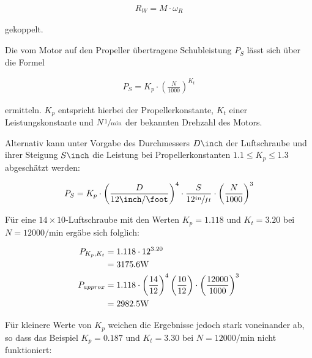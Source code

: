 \begin{align}
	R_W = M \cdot \omega_R
\end{align}

gekoppelt.

\bigbreak {}

Die vom Motor auf den Propeller übertragene Schubleistung $P_S$ lässt sich über die Formel

\begin{align}
	P_S = K_p \cdot \left(\frac{N}{1000}\right)^{K_t}
\end{align}

ermitteln. $K_p$ entspricht hierbei der Propellerkonstante, $K_t$ einer Leistungskonstante  und $N \withunit{\per\minute}$ der bekannten Drehzahl des Motors.

\bigbreak

Alternativ kann unter Vorgabe des Durchmessers $D \withunit{\inch}$ der Luftschraube und ihrer Steigung $S \withunit{\inch}$ die Leistung bei Propellerkonstanten $1.1 \leq K_p \leq 1.3$ abgeschätzt werden:

\begin{align}
	P_S = K_p \cdot \left(\frac{D}{12 \si{\inch\per\foot}}\right)^4 \cdot \frac{S}{12 \sfrac{in}{ft}} \cdot \left(\frac{N}{1000}\right)^3
\end{align}

Für eine $14\times 10$-Luftschraube mit den Werten $K_p = 1.118$ und $K_t = 3.20$ bei $N = 12000 \si{\per\minute}$  ergäbe sich folglich:

\begin{align}
	P_{K_p,K_t} &= 1.118 \cdot 12^{3.20} \\ &= 3175.6 \si{\watt} \notag\\
	P_{approx} &= 1.118 \cdot \left(\frac{14}{12}\right)^4 \left(\frac{10}{12}\right) \cdot \left(\frac{12000}{1000}\right)^3 \\ &= 2982.5 \si{\watt} \notag
\end{align}

Für kleinere Werte von $K_p$ weichen die Ergebnisse jedoch stark voneinander ab, so dass das Beispiel $K_p = 0.187$ und $K_t = 3.30$ bei $N = 12000 \si{\per\minute}$  nicht funktioniert:

